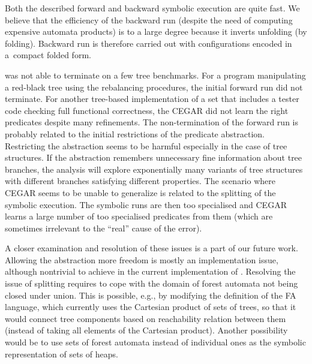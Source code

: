 {Both the described forward and backward symbolic execution are quite fast.
We believe that the efficiency of the backward run (despite the need of computing expensive automata products) is to a large degree because it inverts unfolding (by folding). 
Backward run is therefore carried out with configurations encoded in a~compact folded form. 

\forester{} was not able to terminate on a few tree benchmarks.  
For a program manipulating a red-black tree using the rebalancing procedures, 
the initial forward run did not terminate.  
For another tree-based implementation of a set that includes a tester code checking full functional correctness, the CEGAR did not learn the right
predicates despite many refinements.
%
The non-termination of the forward run is probably related to the initial
restrictions of the predicate abstraction. Restricting the abstraction seems to be harmful especially in the case of tree structures. 
If the abstraction remembers unnecessary fine information about tree branches, the analysis will explore exponentially many variants of tree structures with different branches satisfying different properties.
%
The scenario where CEGAR seems to be unable to generalize is related to the splitting of the symbolic execution. The symbolic runs are then too specialised and CEGAR learns a large number of too specialised predicates from them (which are sometimes irrelevant to the ``real'' cause of the error). 
%

A closer examination and resolution of these issues is a part of our future
work. Allowing the abstraction more freedom is mostly an implementation issue,
although nontrivial to achieve in the current implementation of \forester{}.
Resolving the issue of splitting requires to cope with the domain of forest
automata not being closed under union. This is possible, e.g., by modifying the
definition of the FA language, which currently uses the Cartesian product of
sets of trees, so that it would connect tree components based on reachability
relation between them (instead of taking all elements of the Cartesian product).
Another possibility would be to use sets of forest automata instead of
individual ones as the symbolic representation of sets of heaps.  


}
